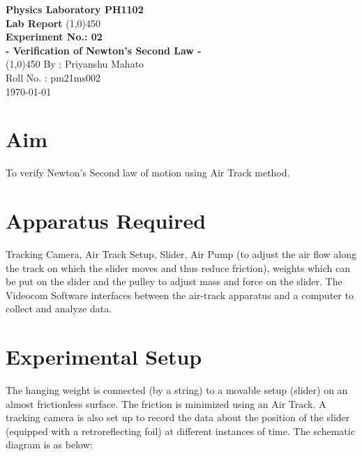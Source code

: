 \documentclass{article}
\begin{document}
	\thispagestyle{empty}%
	\begin{titlepage}
		\begin{center}
			\vspace{1cm}
			\Large\textbf{Physics Laboratory PH1102}\\
			\vspace{1cm}
			\large\textbf{Lab Report}
			\vfill%
			\line(1,0){450}\\[16pt]%
			\huge\textbf{Experiment No.: 02}\\[10pt]
			\Large\textbf{- Verification of Newton's Second Law -}\\[15pt]
			\line(1,0){450}
			\vfill
			By : Priyanshu Mahato\\
			Roll No. : pm21ms002\\%
			\today\\%
			
		\end{center}
	\end{titlepage}
	
	\tableofcontents%
	
	\clearpage%
	
	\section{Aim}
	To verify Newton’s Second law of motion using Air Track method.
	
	\section{Apparatus Required}
	Tracking Camera, Air Track Setup, Slider, Air Pump (to adjust the air flow along 
	the track on which the slider moves and thus reduce friction), weights which can be 
	put on the slider and the pulley to adjust mass and force on the slider. The Videocom 
	Software interfaces between the air-track apparatus and a computer to collect and 
	analyze data.
	
	\section{Experimental Setup}
	The hanging weight is connected (by a string) to a movable setup (slider) on an almost 
	frictionless surface. The friction is minimized using an Air Track. A tracking camera is 
	also set up to record the data about the position of the slider (equipped with a 
	retroreflecting foil) at different instances of time. The schematic diagram is as below:
	
\end{document}
